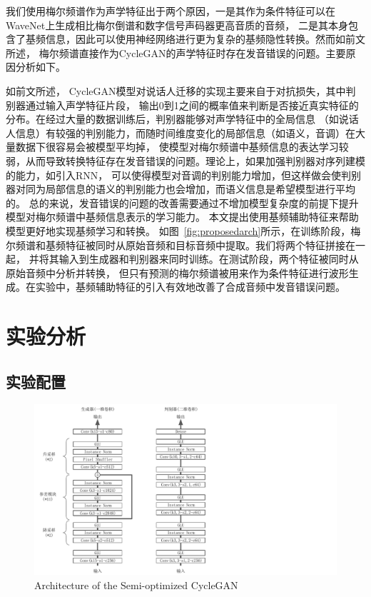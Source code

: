 我们使用梅尔频谱作为声学特征出于两个原因，一是其作为条件特征可以在WaveNet上生成相比梅尔倒谱和数字信号声码器更高音质的音频，
二是其本身包含了基频信息，因此可以使用神经网络进行更为复杂的基频隐性转换。然而如前文所述，
梅尔频谱直接作为CycleGAN的声学特征时存在发音错误的问题。主要原因分析如下。

如前文所述，
CycleGAN模型对说话人迁移的实现主要来自于对抗损失，其中判别器通过输入声学特征片段，
输出0到1之间的概率值来判断是否接近真实特征的分布。在经过大量的数据训练后，判别器能够对声学特征中的全局信息
（如说话人信息）有较强的判别能力，而随时间维度变化的局部信息（如语义，音调）在大量数据下很容易会被模型平均掉，
使模型对梅尔频谱中基频信息的表达学习较弱，从而导致转换特征存在发音错误的问题。理论上，如果加强判别器对序列建模的能力，如引入RNN，
可以使得模型对音调的判别能力增加，但这样做会使判别器对同为局部信息的语义的判别能力也会增加，而语义信息是希望模型进行平均的。
总的来说，发音错误的问题的改善需要通过不增加模型复杂度的前提下提升模型对梅尔频谱中基频信息表示的学习能力。
本文提出使用基频辅助特征来帮助模型更好地实现基频学习和转换。
如图~\ref{fig:proposedarch}所示，在训练阶段，梅尔频谱和基频特征被同时从原始音频和目标音频中提取。我们将两个特征拼接在一起，
并将其输入到生成器和判别器来同时训练。在测试阶段，两个特征被同时从原始音频中分析并转换，
但只有预测的梅尔频谱被用来作为条件特征进行波形生成。在实验中，基频辅助特征的引入有效地改善了合成音频中发音错误问题。

\section{实验分析}
\subsection{实验配置}

\begin{figure}[!htp]
    \centering
    \includegraphics[width=12cm,trim=0 0 250 0,clip]{figure/4_networks.pdf}
    {Architecture of the Semi-optimized CycleGAN}
    \label{fig:networks}
\end{figure}

